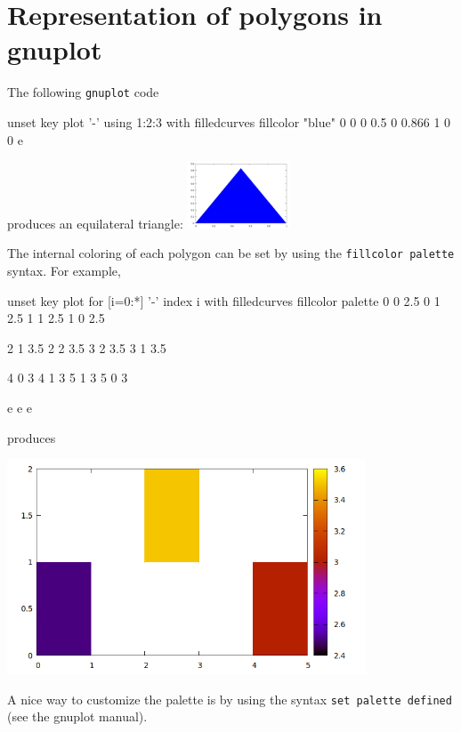 \documentclass{article}
\begin{document}
\clearpage
\appendix

\section{Representation of polygons in gnuplot}
\label{sec:gnuplot}

The
following \texttt{gnuplot} code
\begin{code}
  unset key
  plot '-' using 1:2:3 with filledcurves fillcolor "blue"
  0 0 0
  0.5 0 0.866
  1 0 0
  e
\end{code}
produces an equilateral triangle: \includegraphics[height=2cm]{triangle.png}

\medskip

The internal coloring of each polygon can be set by using the
\texttt{fillcolor palette} syntax. For example,
\begin{scriptsize}
\begin{code}
unset key
plot for [i=0:*] '-' index i with filledcurves fillcolor palette
	0 0 2.5 
	0 1 2.5
	1 1 2.5
	1 0 2.5

	2 1 3.5 
	2 2 3.5
	3 2 3.5
	3 1 3.5

	4 0 3 
	4 1 3
	5 1 3
	5 0 3

e
e
e        
\end{code}
\end{scriptsize}
produces
\begin{center}
  \includegraphics[width=0.8\textwidth]{squares}
\end{center}

A nice way to customize the palette is by using the syntax \texttt{set
palette defined} (see the gnuplot manual).
\end{document}

